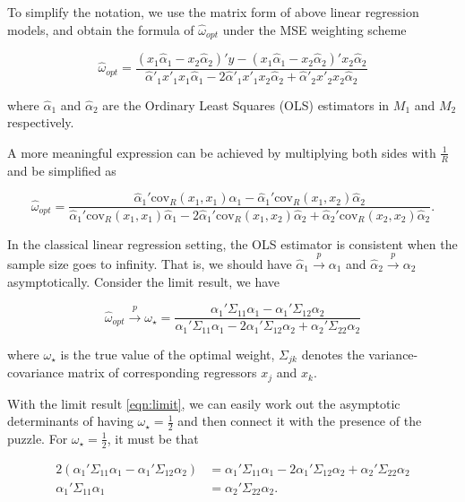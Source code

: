 \documentclass{monashthesis}
\begin{document}
To simplify the notation, we use the matrix form of above linear regression models, and obtain the formula of \(\hat\omega_{opt}\) under the MSE weighting scheme

\begin{equation}
\label{eqn:opt}
\hat\omega_{opt} = \frac{(x_1 \hat\alpha_1 - x_2 \hat\alpha_2)' y - (x_1 \hat\alpha_1 - x_2 \hat\alpha_2)' x_2 \hat\alpha_2}{\hat\alpha'_1 x'_1 x_1 \hat\alpha_1 - 2\hat\alpha'_1 x'_1 x_2 \hat\alpha_2 + \hat\alpha'_2 x'_2 x_2 \hat\alpha_2}
\end{equation}

where \(\hat\alpha_1\) and \(\hat\alpha_2\) are the Ordinary Least Squares (OLS) estimators in \(M_1\) and \(M_2\) respectively.

A more meaningful expression can be achieved by multiplying both sides with \(\frac{1}{R}\) and be simplified as

\begin{equation}
\hat\omega_{opt} = \frac{\hat\alpha_1'\text{cov}_R(x_1,x_1)\hat\alpha_1 - \hat\alpha_1'\text{cov}_R(x_1,x_2)\hat\alpha_2}{\hat\alpha_1' \text{cov}_R(x_1,x_1)\hat\alpha_1 - 2\hat\alpha_1'\text{cov}_R(x_1,x_2)\hat\alpha_2 + \hat\alpha_2'\text{cov}_R(x_2,x_2)\hat\alpha_2}.
\end{equation}

In the classical linear regression setting, the OLS estimator is consistent when the sample size goes to infinity. That is, we should have \(\hat\alpha_1 \overset{p}{\to} \alpha_1\) and \(\hat\alpha_2 \overset{p}{\to} \alpha_2\) asymptotically. Consider the limit result, we have

\begin{equation}
\label{eqn:limit}
\hat\omega_{opt} \overset{p}{\to} \omega_\star = \frac{\alpha_1'\Sigma_{11}\alpha_1 - \alpha_1'\Sigma_{12}\alpha_2}{\alpha_1'\Sigma_{11}\alpha_1 - 2\alpha_1'\Sigma_{12}\alpha_2 + \alpha_2'\Sigma_{22}\alpha_2}
\end{equation}

where \(\omega_\star\) is the true value of the optimal weight, \(\Sigma_{jk}\) denotes the variance-covariance matrix of corresponding regressors \(x_j\) and \(x_k\).

With the limit result \ref{eqn:limit}, we can easily work out the asymptotic determinants of having \(\omega_\star=\frac{1}{2}\) and then connect it with the presence of the puzzle. For \(\omega_\star=\frac{1}{2}\), it must be that

\begin{align*}
2 (\alpha_1'\Sigma_{11}\alpha_1 - \alpha_1'\Sigma_{12}\alpha_2) &= \alpha_1'\Sigma_{11}\alpha_1 - 2\alpha_1'\Sigma_{12}\alpha_2 + \alpha_2'\Sigma_{22}\alpha_2 \\
\alpha_1'\Sigma_{11}\alpha_1 &= \alpha_2'\Sigma_{22}\alpha_2. \\
\end{align*}
\end{document}
